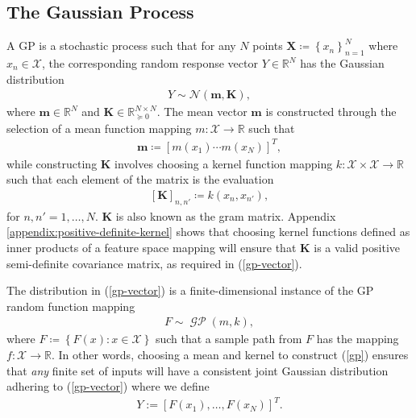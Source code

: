 \documentclass{article}
\newcommand{\GP}{\operatorname{\mathcal{GP}}}
\numberwithin{equation}{section}
\begin{document}
\subsection{The Gaussian Process}\label{section:the-gp}
A GP is a stochastic process such that for any $N$ points $\mathbf{X} \coloneqq \left\{ x_n\right\}_{n=1}^N$ where $x_n \in \mathcal{X}$, the corresponding random response vector $Y \in \mathbb{R}^N$ has the Gaussian distribution
\begin{align}
    \label{gp-vector}
    Y \sim \mathcal{N}\left(\mathbf{m}, \mathbf{K}\right),
\end{align}
where $\mathbf{m} \in \mathbb{R}^N$ and $\mathbf{K} \in  \mathbb{R}^{N \times N}_{\succcurlyeq 0}$.
The mean vector $\mathbf{m}$ is constructed through the selection of a mean function mapping $m: \mathcal{X} \rightarrow \mathbb{R}$ such that
\begin{align}
    \label{gp-mean-vector}
    \mathbf{m} \coloneqq \left[ m(x_1) \cdots m(x_N)\right]^T,
\end{align}
while constructing $\mathbf{K}$ involves choosing a kernel function mapping $k: \mathcal{X} \times \mathcal{X} \rightarrow \mathbb{R}$ such that each element of the matrix is the evaluation
\begin{align}
    \label{gp-kernel-matrix}
    \left[\mathbf{K}\right]_{n, n'} \coloneqq k(x_n, x_{n'}),
\end{align}
for $n, n'=1,\dots, N$.
$\mathbf{K}$ is also known as the gram matrix.
Appendix \ref{appendix:positive-definite-kernel} shows that choosing kernel functions defined as inner products of a feature space mapping will ensure that $\mathbf{K}$ is a valid positive semi-definite covariance matrix, as required in (\ref{gp-vector}).


The distribution in (\ref{gp-vector}) is a finite-dimensional instance of the GP random function mapping
\begin{align}
    F \sim \GP(m, k),
    \label{gp}
\end{align}
 where $F \coloneqq \left\{F(x): x \in \mathcal{X}\right\}$ such that a sample path from $F$ has the mapping $f: \mathcal{X} \rightarrow \mathbb{R}$.
In other words, choosing a mean and kernel to construct (\ref{gp}) ensures that \textit{any} finite set of inputs will have a consistent joint Gaussian distribution adhering to (\ref{gp-vector}) where we define 
\begin{align}
    Y:=\left[F(x_1),\hdots, F(x_N)\right]^T.
\end{align}
\end{document}
